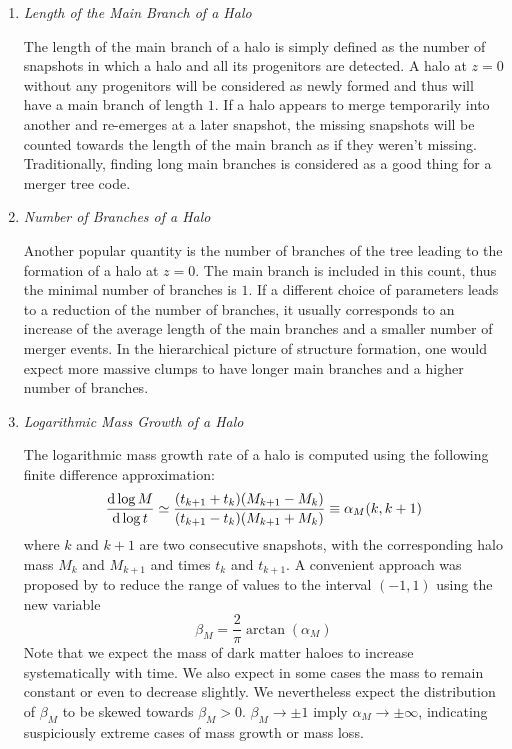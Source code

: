 \begin{enumerate}
  \setlength\itemsep{1em}
\item \emph{Length of the Main Branch of a Halo}
  
  The length of the main branch of a halo is simply defined as the
  number of snapshots in which a halo and all its progenitors are
  detected.  A halo at $z=0$ without any progenitors will be
  considered as newly formed and thus will have a main branch of
  length $1$.  If a halo appears to merge temporarily into another and
  re-emerges at a later snapshot, the missing snapshots will be
  counted towards the length of the main branch as if they weren't
  missing. Traditionally, finding long main branches is considered
  as a good thing for a merger tree code.
  
\item \emph{Number of Branches of a Halo}
  
  Another popular quantity is the number of branches of the tree
  leading to the formation of a halo at $z=0$.  The main branch is
  included in this count, thus the minimal number of branches is
  $1$. If a different choice of parameters leads to a reduction of the
  number of branches, it usually corresponds to an increase of the
  average length of the main branches and a smaller number of merger
  events.  In the hierarchical picture of structure formation, one
  would expect more massive clumps to have longer main branches and a
  higher number of branches.
  
\item \emph{Logarithmic Mass Growth of a Halo}
  
  The logarithmic mass growth rate of a halo is computed using the following
  finite difference approximation:
  \begin{equation}
    \frac{\mathrm{d} \log M}{\mathrm{d} \log t} \simeq
    \frac{(t_{k+1}+t_{k})(M_{k+1} -M_{k})}{(t_{k+1} - t_k)(M_{k+1} +
      M_{k})} \equiv \alpha_M(k, k+1)
  \end{equation}
  where $k$ and $k+1$ are two consecutive snapshots, with the
  corresponding halo mass $M_k$ and $M_{k+1}$ and times $t_k$ and
  $t_{k+1}$. A convenient approach was proposed by \cite{SUSSING_CONVERGENCE}
  to reduce the range of values to the interval $(-1, 1)$ using the new variable
  \begin{equation}
    \beta_M = \frac{2}{\pi}\arctan(\alpha_M) \label{eq:massgrowth}
  \end{equation}
  Note that we expect the mass of dark matter haloes to increase
  systematically with time.  We also expect in some cases the mass to
  remain constant or even to decrease slightly.  We nevertheless
  expect the distribution of $\beta_M$ to be skewed towards $\beta_M >
  0$.  $\beta_M \rightarrow \pm 1$ imply $\alpha_M \rightarrow \pm
  \infty$, indicating suspiciously extreme cases of mass growth or
  mass loss.
  

\end{enumerate}
